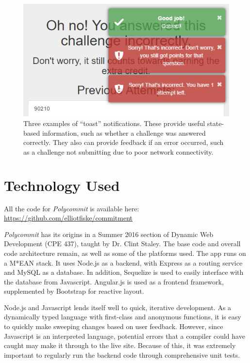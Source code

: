 \begin{figure}
	\includegraphics{figures/pc-toast}
	\caption{Three examples of ``toast'' notifications. These provide useful state-based information, such as whether a challenge was answered correctly. They also can provide feedback if an error occurred, such as a challenge not submitting due to poor network connectivity.}
	\label{fig:polycommit6}
\end{figure}

\section{Technology Used}
\par All the code for \textit{Polycommit} is available here:
\hyperref[https://github.com/elliotfiske/commitment]{https://github.com/elliotfiske/commitment}

\par \textit{Polycommit} has its origins in a Summer 2016 section of Dynamic Web Development (CPE 437), taught by Dr. Clint Staley. The base code and overall code architecture remain, as well as some of the platforms used. The app runs on a M*EAN stack. It uses Node.js as a backend, with Express as a routing service and MySQL as a database. In addition, Sequelize is used to easily interface with the database from Javascript. Angular.js is used as a frontend framework, supplemented by Bootstrap for reactive layout.

\par Node.js and Javascript lends itself well to quick, iterative development. As a dynamically typed language with first-class and anonymous functions, it is easy to quickly make sweeping changes based on user feedback. However, since Javascript is an interpreted language, potential errors that a compiler could have caught may make it through to the live site. Because of this, it was extremely important to regularly run the backend code through comprehensive unit tests.

